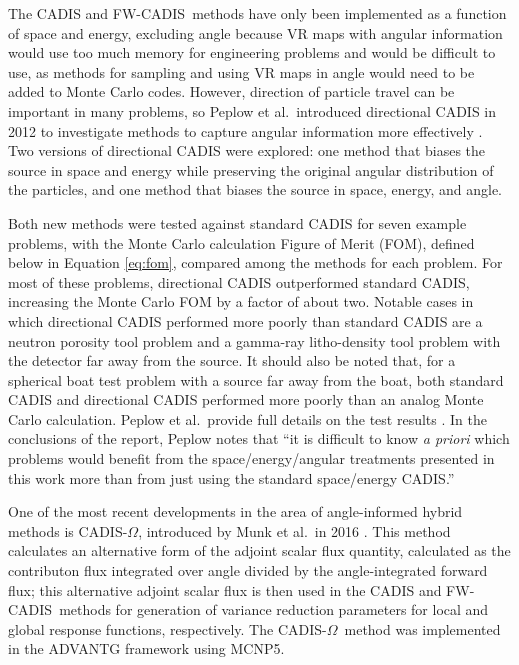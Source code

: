 \documentclass{article} %
\newcommand{\fwc}{\mbox{FW-CADIS}}
\newcommand{\co}{\mbox{CADIS-$\Omega$}}
\begin{document}
The CADIS and \fwc\ methods have only been implemented as a function of space
and energy, excluding angle because VR maps with angular information would use
too much memory for engineering problems and would be difficult to use, as
methods for sampling and using VR maps in angle would need to be added to Monte
Carlo codes. However, direction of particle travel can be important in many
problems, so Peplow et al.\ introduced directional CADIS in 2012 to investigate
methods to capture angular information more effectively \cite{peplow}. Two
versions of directional CADIS were explored: one method that biases the source
in space and energy while preserving the original angular distribution of the
particles, and one method that biases the source in space, energy, and angle.

Both new methods were tested against standard
CADIS for seven example problems, with the Monte Carlo calculation Figure of
Merit (FOM), defined below in Equation \eqref{eq:fom}, compared among the
methods for each problem. For most of these problems, directional CADIS
outperformed standard CADIS, increasing the Monte Carlo FOM by a factor of
about two. Notable cases in which directional CADIS performed more poorly than
standard CADIS are a neutron porosity tool problem and a gamma-ray litho-density
tool problem with the detector far away from the source. It should
also be noted that, for a spherical boat test problem with a source far away
from the boat, both standard CADIS and directional CADIS performed more poorly
than an analog Monte Carlo calculation. Peplow et al.\ provide full details on
the test results \cite{peplow}. In the conclusions of the
report, Peplow notes that ``it is difficult to know \textit{a priori} which
problems would benefit from the space/energy/angular treatments presented in
this work more than from just using the standard space/energy CADIS.''

One of the most recent developments in the area of angle-informed hybrid
methods is \co, introduced by Munk et al.\ in 2016 \cite{cadisom}. This method
calculates an alternative form of the adjoint scalar flux quantity, calculated
as the contributon flux integrated over angle divided by the angle-integrated
forward flux; this alternative adjoint scalar flux is then used in the CADIS
and \fwc\ methods for generation of variance reduction parameters for local
and global response functions, respectively. The \co\ method was implemented
in the ADVANTG framework using MCNP5. 
\end{document}
